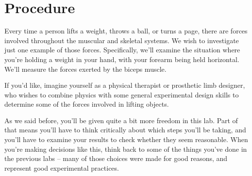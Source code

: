 \temp{\clearpage}
\section*{Procedure}
Every time a person lifts a weight, throws a ball, or turns a page,
there are forces involved throughout the muscular and skeletal systems.
We wish to investigate just one example of those forces.
Specifically, we'll examine the situation where you're holding a weight in your
hand, with your forearm being held horizontal.
We'll measure the forces exerted by the biceps muscle.

If you'd like, imagine yourself as a 
physical therapist or prosthetic limb designer,
who wishes to combine physics with some 
general experimental design skills to determine 
some of the forces involved in lifting objects.


As we said before, you'll be given quite a bit more freedom in this lab.
Part of that means you'll have to think critically about 
which steps you'll be taking, and you'll have to examine your results to 
check whether they seem reasonable.  
When you're making decisions like this, think back to some of the things
you've done in the previous labs -- many of those choices were made 
for good reasons, and represent good experimental practices.


